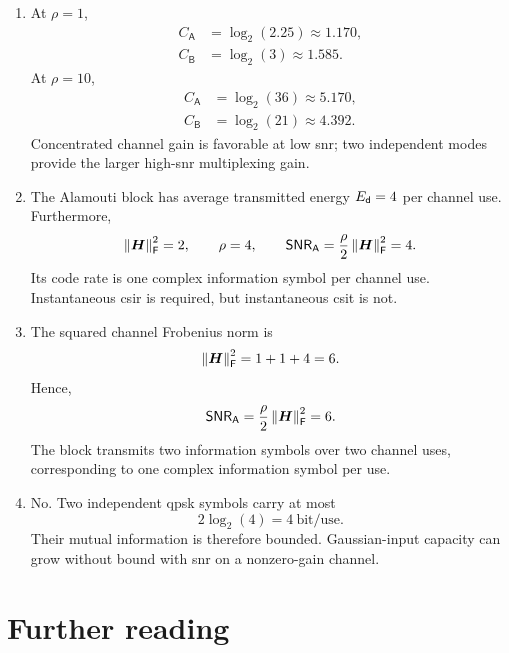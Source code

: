 \begin{enumerate}[label=\textbf{E\arabic*.}]
	\item At $\rho=1$,
	\begin{align*}
		C_{\mathsf A}
		&=\log_2(2.25)\approx1.170,\\
		C_{\mathsf B}
		&=\log_2(3)\approx1.585.
	\end{align*}
	At $\rho=10$,
	\begin{align*}
		C_{\mathsf A}
		&=\log_2(36)\approx5.170,\\
		C_{\mathsf B}
		&=\log_2(21)\approx4.392.
	\end{align*}
	Concentrated channel gain is favorable at low
	\ac{snr}; two independent modes provide the
	larger high-\ac{snr} multiplexing gain.
	
	\item The Alamouti block has average transmitted
	energy $E_{\mathsf{d}}=4$ per channel use.
	Furthermore,
	\begin{equation*}
		\left\|\bm{H}\right\|_{\mathsf{F}}^2=2,\qquad
		\rho=4,\qquad
		\mathsf{SNR}_{\mathsf A}=\frac{\rho}{2}
		\left\|\bm{H}\right\|_{\mathsf{F}}^2=4.
	\end{equation*}
	Its code rate is one complex information symbol
	per channel use. Instantaneous \ac{csir} is
	required, but instantaneous \ac{csit} is not.
	
	\item The squared channel Frobenius norm is
	\begin{equation*}
		\left\|\bm{H}\right\|_{\mathsf{F}}^2=1+1+4=6.
	\end{equation*}
	Hence,
	\begin{equation*}
		\mathsf{SNR}_{\mathsf A}
		=\frac{\rho}{2}\left\|\bm{H}\right\|_{\mathsf{F}}^2=6.
	\end{equation*}
	The block transmits two information symbols
	over two channel uses, corresponding to one
	complex information symbol per use.
	
	\item No. Two independent \ac{qpsk} symbols
	carry at most
	\begin{equation*}
		2\log_2(4)=4\ \text{bit/use}.
	\end{equation*}
	Their mutual information is therefore bounded.
	Gaussian-input capacity can grow without bound
	with \ac{snr} on a nonzero-gain channel.
	
\end{enumerate}


\section*{Further reading}

